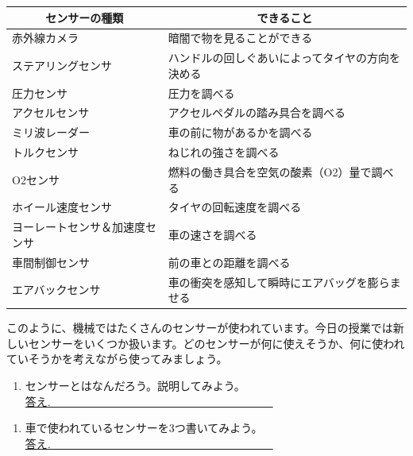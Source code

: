 \begin{table}[htb]
  \centering
  \begin{tabular}{|l|l|} \hline
\multicolumn{1}{|c|}{センサーの種類} & \multicolumn{1}{c|}{できること} \\ \hline\hline
赤外線カメラ & 暗闇で物を見ることができる \\
ステアリングセンサ & ハンドルの回しぐあいによってタイヤの方向を決める \\
圧力センサ & 圧力を調べる \\
アクセルセンサ & アクセルペダルの踏み具合を調べる \\
ミリ波レーダー & 車の前に物があるかを調べる \\
トルクセンサ & ねじれの強さを調べる \\
O2センサ & 燃料の働き具合を空気の酸素（O2）量で調べる \\
ホイール速度センサ & タイヤの回転速度を調べる \\
ヨーレートセンサ＆加速度センサ & 車の速さを調べる \\
車間制御センサ & 前の車との距離を調べる \\
エアバックセンサ & 車の衝突を感知して瞬時にエアバッグを膨らませる \\ \hline
  \end{tabular}
\end{table}

このように、機械ではたくさんのセンサーが使われています。今日の授業では新しいセンサーをいくつか扱います。どのセンサーが何に使えそうか、何に使われていそうかを考えながら使ってみましょう。\\

\begin{tcolorbox}[title=\useOmetoi]
\begin{enumerate}
\item センサーとはなんだろう。説明してみよう。\\
\underline{答え.　　　　　　　　　　　　　　　　　　　　}
\end{enumerate}
\end{tcolorbox}
\begin{tcolorbox}[title=\useOmetoi]
\begin{enumerate}
\item 車で使われているセンサーを3つ書いてみよう。\\
\underline{答え.　　　　　　　　　　　　　　　　　　　　}
\end{enumerate}
\end{tcolorbox}

